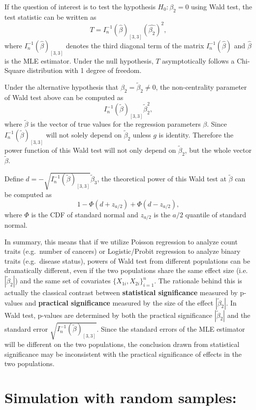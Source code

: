 \documentclass[
]{article}
\begin{document}
If the question of interest is to test the hypothesis \(H_0: \beta_2=0\)
using Wald test, the test statistic can be written as
\[T = I_n^{-1}(\hat{\beta})_{[3,3]}(\hat{\beta_2})^2,\] where
\(I_n^{-1}(\hat{\beta})_{[3,3]}\) denotes the third diagonal term of the
matrix \(I_n^{-1}(\hat{\beta})\) and \(\hat{\beta}\) is the MLE
estimator. Under the null hypothesis, \(T\) asymptotically follows a
Chi-Square distribution with 1 degree of freedom.

Under the alternative hypothesis that
\(\beta_2 = \tilde{\beta}_2 \neq 0\), the non-centrality parameter of
Wald test above can be computed as
\[I_n^{-1}(\tilde{\beta})_{[3,3]}\tilde{\beta}_2^2,\] where
\(\tilde{\beta}\) is the vector of true values for the regression
parameters \(\beta\). Since \(I_n^{-1}(\tilde{\beta})_{[3,3]}\) will not
solely depend on \(\tilde{\beta}_2\) unless \(g\) is identity. Therefore
the power function of this Wald test will not only depend on
\(\tilde{\beta}_2\), but the whole vector \(\tilde{\beta}\).

Define \(d=-\sqrt{I_n^{-1}(\tilde{\beta})_{[3,3]}}\tilde{\beta}_3\), the
theoretical power of this Wald test at \(\tilde{\beta}\) can be computed
as \[1-\Phi(d+z_{a/2})+\Phi(d-z_{a/2}),\] where \(\Phi\) is the CDF of
standard normal and \(z_{a/2}\) is the \(a/2\) quantile of standard
normal.

In summary, this means that if we utilize Poisson regression to analyze
count traits (e.g.~number of cancers) or Logistic/Probit regression to
analyze binary traits (e.g.~disease status), powers of Wald test from
different populations can be dramatically different, even if the two
populations share the same effect size (i.e.~\(|\tilde{\beta}_2|\)) and
the same set of covariates \(\{X_{1i},X_{2i}\}_{i=1}^n\). The rationale
behind this is actually the classical contrast between
\textbf{statistical significance} measured by p-values and
\textbf{practical significance} measured by the size of the effect
\(|\tilde{\beta}_2|\). In Wald test, p-values are determined by both the
practical significance \(|\tilde{\beta}_2|\) and the standard error
\(\sqrt{I_n^{-1}(\tilde{\beta})_{[3,3]}}\). Since the standard errors of
the MLE estimator will be different on the two populations, the
conclusion drawn from statistical significance may be inconsistent with
the practical significance of effects in the two populations.

\hypertarget{simulation-with-random-samples}{%
\section{Simulation with random
samples:}\label{simulation-with-random-samples}}
\end{document}
